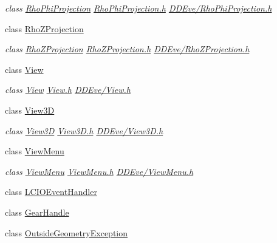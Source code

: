 \begin{DoxyCompactItemize}
\begin{DoxyCompactList}\small\item\em class \hyperlink{class_d_d4hep_1_1_rho_phi_projection}{RhoPhiProjection} \hyperlink{_rho_phi_projection_8h}{RhoPhiProjection.h} \hyperlink{_rho_phi_projection_8h}{DDEve/RhoPhiProjection.h} \item\end{DoxyCompactList}\item 
class \hyperlink{class_d_d4hep_1_1_rho_z_projection}{RhoZProjection}
\begin{DoxyCompactList}\small\item\em class \hyperlink{class_d_d4hep_1_1_rho_z_projection}{RhoZProjection} \hyperlink{_rho_z_projection_8h}{RhoZProjection.h} \hyperlink{_rho_z_projection_8h}{DDEve/RhoZProjection.h} \item\end{DoxyCompactList}\item 
class \hyperlink{class_d_d4hep_1_1_view}{View}
\begin{DoxyCompactList}\small\item\em class \hyperlink{class_d_d4hep_1_1_view}{View} \hyperlink{_view_8h}{View.h} \hyperlink{_view_8h}{DDEve/View.h} \item\end{DoxyCompactList}\item 
class \hyperlink{class_d_d4hep_1_1_view3_d}{View3D}
\begin{DoxyCompactList}\small\item\em class \hyperlink{class_d_d4hep_1_1_view3_d}{View3D} \hyperlink{_view3_d_8h}{View3D.h} \hyperlink{_view3_d_8h}{DDEve/View3D.h} \item\end{DoxyCompactList}\item 
class \hyperlink{class_d_d4hep_1_1_view_menu}{ViewMenu}
\begin{DoxyCompactList}\small\item\em class \hyperlink{class_d_d4hep_1_1_view_menu}{ViewMenu} \hyperlink{_view_menu_8h}{ViewMenu.h} \hyperlink{_view_menu_8h}{DDEve/ViewMenu.h} \item\end{DoxyCompactList}\item 
class \hyperlink{class_d_d4hep_1_1_l_c_i_o_event_handler}{LCIOEventHandler}
\item 
class \hyperlink{class_d_d4hep_1_1_gear_handle}{GearHandle}
\item 
class \hyperlink{class_d_d4hep_1_1_outside_geometry_exception}{OutsideGeometryException}
\end{DoxyCompactItemize}
